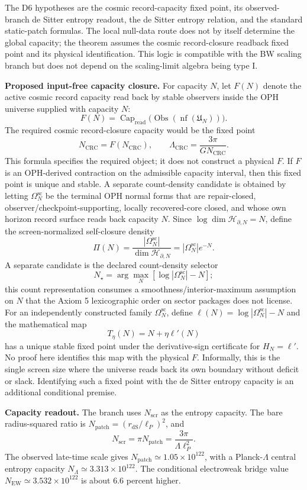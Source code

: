 The D6 hypotheses are the cosmic record-capacity fixed point, its observed-branch de Sitter entropy
readout, the de Sitter entropy relation, and the standard static-patch formulas. The local null-data
route does not by itself determine the global capacity; the theorem assumes the cosmic
record-closure readback fixed point and its physical identification. This
logic is compatible with the BW scaling branch but does not depend on the scaling-limit algebra
being type I.

\textbf{Proposed input-free capacity closure.} For capacity \(N\), let \(F(N)\) denote the active
cosmic record capacity read back by stable observers inside the OPH universe supplied with capacity
\(N\):
\[
F(N)=
\operatorname{Cap}_{\mathrm{read}}
\bigl(\operatorname{Obs}(\operatorname{nf}(\mathfrak U_N))\bigr).
\]
The required cosmic record-closure capacity would be the fixed point
\[
N_{\mathrm{CRC}}=F(N_{\mathrm{CRC}}),
\qquad
\Lambda_{\mathrm{CRC}}=\frac{3\pi}{G N_{\mathrm{CRC}}}.
\]
This formula specifies the required object; it does not construct a physical \(F\).
If \(F\) is an OPH-derived contraction on the admissible capacity interval, then this fixed point is
unique and stable. A separate count-density candidate is obtained by letting
\(\Omega^{\mathrm{sc}}_N\) be the terminal OPH normal forms that are repair-closed,
observer/checkpoint-supporting, locally recovered-core closed, and whose own horizon record surface
reads back capacity \(N\). Since \(\log\dim\mathcal H_{\partial,N}=N\), define the
screen-normalized self-closure density
\[
\Pi(N)=\frac{|\Omega^{\mathrm{sc}}_N|}{\dim\mathcal H_{\partial,N}}
=|\Omega^{\mathrm{sc}}_N|e^{-N}.
\]
A separate candidate is the declared count-density selector
\[
N_\star=\arg\max_N\left[\log|\Omega^{\mathrm{sc}}_N|-N\right];
\]
this count representation consumes a smoothness/interior-maximum assumption on \(N\) that the
Axiom 5 lexicographic order on sector packages does not license.
For an independently constructed family \(\Omega^{\mathrm{sc}}_N\), define
\(\ell(N)=\log|\Omega^{\mathrm{sc}}_N|-N\) and the mathematical map
\[
T_\eta(N)=N+\eta\ell'(N)
\]
has a unique stable fixed point under the derivative-sign certificate for \(H_N=\ell'\). No proof
here identifies this map with the physical \(F\).
Informally, this is the single screen size where the universe reads back its own boundary without
deficit or slack. Identifying such a fixed point with the de Sitter entropy capacity is an additional
conditional premise.

\textbf{Capacity readout.} The branch uses \(N_{\mathrm{scr}}\) as the entropy capacity. The
bare radius-squared ratio is \(N_{\mathrm{patch}}=(r_{\mathrm{dS}}/\ell_P)^2\), and
\[
N_{\mathrm{scr}}=\pi N_{\mathrm{patch}}
=\frac{3\pi}{\Lambda\ell_P^2}.
\]
The observed late-time scale gives \(N_{\mathrm{patch}}\simeq1.05\times10^{122}\),
with a Planck-\(\Lambda\) central entropy capacity
\(N_\Lambda\simeq3.313\times10^{122}\). The conditional electroweak bridge value
\(N_{\mathrm{EW}}\simeq3.532\times10^{122}\) is about \(6.6\) percent higher.

